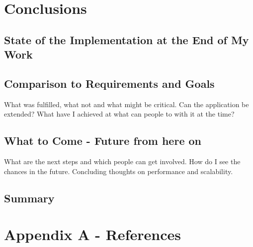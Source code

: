 \documentclass[twoside, 11pt]{scrartcl}
\begin{document}
\section{Conclusions}
\label{sec:conclusions}
\subsection{State of the Implementation at the End of My Work}
\subsection{Comparison to Requirements and Goals}
What was fulfilled, what not and what might be critical. Can the application be extended? What have I achieved at what can people to with it at the time?\\
\subsection{What to Come - Future from here on}
What are the next steps and which people can get involved. How do I see the chances in the future. Concluding thoughts on performance and scalability.
\subsection{Summary}


\section*{Appendix A - References}


\end{document}

